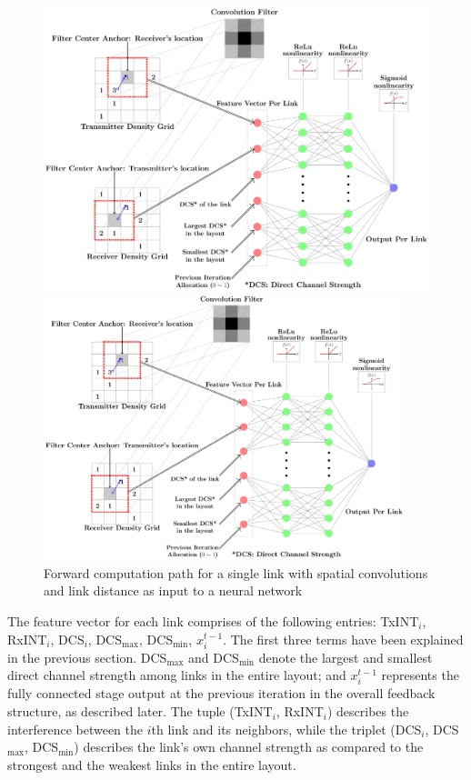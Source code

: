 \documentclass[journal,12pt,onecolumn,draftclsnofoot,]{IEEEtran}
\begin{document}
\begin{figure}
        \centering
        \ifOneColumn
            \centerline{\includegraphics[width=13cm]{fig/ForwardPath}}
        \else
            \centerline{\includegraphics[width=10.5cm]{fig/ForwardPath}}
        \fi
        \caption{Forward computation path for a single link with spatial convolutions and link distance as input to a neural network}
        \label{fig:fpath}
\end{figure}

The feature vector for each link comprises of the following entries: TxINT$_i$,
RxINT$_i$, DCS$_i$, DCS$_{\max}$, DCS$_{\min}$, $x_{i}^{t-1}$. The first three
terms have been explained in the previous section. DCS$_{\max}$ and DCS$_{\min}$
denote the largest and smallest direct channel strength among links in the
entire layout; and $x_{i}^{t-1}$ represents the fully connected stage output at
the previous iteration in the overall feedback structure, as described later.
The tuple (TxINT$_i$, RxINT$_i$) describes the interference between
the $i$th link and its neighbors, while the triplet (DCS$_i$, DCS$_{\max}$,
DCS$_{\min}$) describes the link's own channel strength as compared to the 
strongest and the weakest links in the entire layout. 
\end{document}
